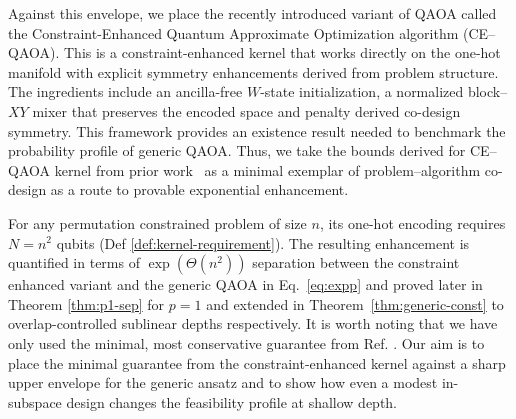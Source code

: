 \documentclass[a4paper,onecolumn,11pt,unpublished]{quantumarticle}
\theoremstyle{remark}
\begin{document}
\medskip
\noindent
Against this envelope, we place the recently introduced variant of QAOA called the Constraint-Enhanced Quantum Approximate Optimization algorithm (CE–QAOA)\cite{onahce}. This is a constraint-enhanced kernel that works directly on the one-hot manifold with explicit symmetry enhancements derived from problem structure. The ingredients include an ancilla-free \(W\)-state initialization, a normalized block–\(XY\) mixer that preserves the encoded space and penalty derived co-design symmetry. This framework provides an existence result needed to benchmark the probability profile of generic QAOA. Thus, we take the bounds derived for CE–QAOA kernel from prior work~\cite{onahce} as a minimal exemplar of problem–algorithm co-design as a route to provable exponential enhancement. %

\medskip
\noindent
For any permutation constrained problem of size $n$, its one-hot encoding requires \(N=n^2\) qubits (Def \ref{def:kernel-requirement}). The resulting enhancement is quantified in terms of $\exp(\Theta(n^2))$ separation between the constraint enhanced variant and the generic QAOA in Eq.~\eqref{eq:expp} and proved later in Theorem \ref{thm:p1-sep} for $p=1$ and extended in Theorem~\ref{thm:generic-const} to
overlap-controlled sublinear depths respectively. It is worth noting that we have only used the minimal, most conservative guarantee from Ref. \cite{onahce}. Our aim is to place the minimal guarantee from the constraint-enhanced kernel against a sharp upper envelope for the generic ansatz and to show how even a modest in-subspace design changes the feasibility profile at shallow depth. %

\end{document}
